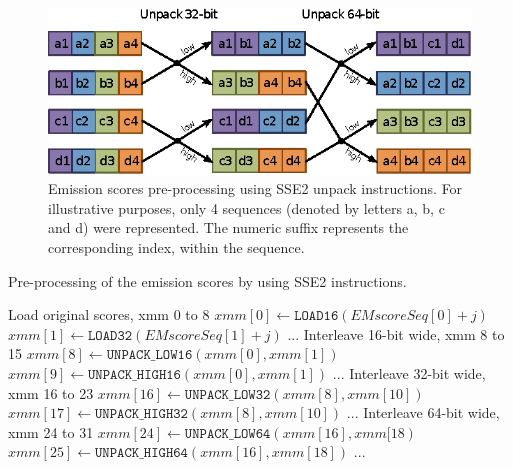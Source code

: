 \documentclass{bmcart}
\begin{document}
\begin{figure}[!b]
  \centering
  \includegraphics{img/scores-loading-rognes.eps}
  \caption{Emission scores pre-processing using SSE2 unpack instructions. For illustrative purposes, only 4 sequences (denoted by letters \textsf{a}, \textsf{b}, \textsf{c} and \textsf{d}) were represented. The numeric suffix represents the corresponding index, within the sequence.}
  \label{scores-loading-rognes}
\end{figure}

\begin{algorithm}[!t]
\caption{Pre-processing of the emission scores by using SSE2 instructions.}
\label{scores_pre_processing}
\begin{algorithmic}
  \LeftComment Load original scores, xmm 0 to 8
  \State $xmm[0] \gets \mathtt{LOAD16}(\mathit{EMscoreSeq}[0]+j) $
  \State $xmm[1] \gets \mathtt{LOAD32}(\mathit{EMscoreSeq}[1]+j) $
  \State ...
  \LeftComment Interleave 16-bit wide, xmm 8 to 15
  \State $xmm[8] \gets \mathtt{UNPACK\_LOW16}(xmm[0], xmm[1]) $
  \State $xmm[9] \gets \mathtt{UNPACK\_HIGH16}(xmm[0], xmm[1]) $
  \State ...
  \LeftComment Interleave 32-bit wide, xmm 16 to 23
  \State $xmm[16] \gets \mathtt{UNPACK\_LOW32}(xmm[8], xmm[10]) $
  \State $xmm[17] \gets \mathtt{UNPACK\_HIGH32}(xmm[8], xmm[10]) $
  \State ...
  \LeftComment Interleave 64-bit wide, xmm 24 to 31
  \State $xmm[24] \gets \mathtt{UNPACK\_LOW64}(xmm[16], xmm[18) $
  \State $xmm[25] \gets \mathtt{UNPACK\_HIGH64}(xmm[16], xmm[18]) $
  \State ...
\EndProcedure
\end{algorithmic}
\end{algorithm}
\end{document}
